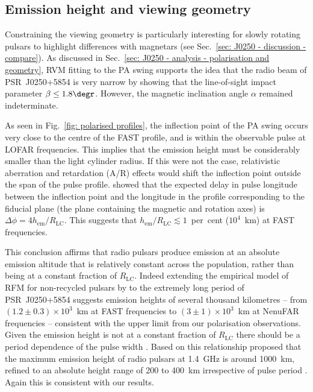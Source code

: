 \subsection{Emission height and viewing geometry}
\label{sec: J0250 - discussion - geometry}



Constraining the viewing geometry is particularly interesting for slowly rotating pulsars to highlight differences with magnetars (see Sec.~\ref{sec: J0250 - discussion - compare}). As discussed in Sec.~\ref{sec: J0250 - analysis - polarisation and geometry}, RVM fitting to the PA swing supports the idea that the radio beam of PSR~J0250+5854 is very narrow by showing that the line-of-sight impact parameter $\beta \leq 1.8\degr$. However, the magnetic inclination angle $\alpha$ remained indeterminate.

As seen in Fig.~\ref{fig: polarised profiles}, the inflection point of the PA swing occurs very close to the centre of the FAST profile, and is within the observable pulse at LOFAR frequencies. This implies that the emission height must be considerably smaller than the light cylinder radius. If this were not the case, relativistic aberration and retardation (A/R) effects would shift the inflection point outside the span of the pulse profile. \citet{BCWx1991} showed that the expected delay in pulse longitude between the inflection point and the longitude in the profile corresponding to the fiducial plane (the plane containing the magnetic and rotation axes) is $\Delta\phi = 4 h_\mathrm{em} / R_\mathrm{LC}$. This suggests that  $h_\mathrm{em} / R_\mathrm{LC} \lesssim 1$~per~cent ($10^{4}$~km) at FAST frequencies.

This conclusion affirms that radio pulsars produce emission at an absolute emission altitude that is relatively constant across the population, rather than being at a constant fraction of $R_\mathrm{LC}$. Indeed extending the empirical model of RFM for non-recycled pulsars by \citet{KGxx2003} to the extremely long period of PSR~J0250+5854 suggests emission heights of several thousand kilometres -- from $(1.2\pm0.3)\times 10^3$~km at FAST frequencies to $(3\pm1)\times10^3$~km at NenuFAR frequencies -- consistent with the upper limit from our polarisation observations. Given the emission height is not at a constant fraction of $R_\mathrm{LC}$ there should be a period dependence of the pulse width \citep[e.g.][]{Rxxx1993}. Based on this relationship \citet{KJxx2007} proposed that the maximum emission height of radio pulsars at 1.4~GHz is around 1000~km, refined to an absolute height range of 200 to 400~km irrespective of pulse period \citep{JKxx2019, JSKx2020}. Again this is consistent with our results.

